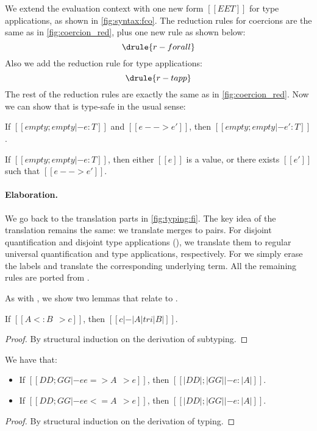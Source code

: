 We extend the evaluation context with one new form $[[EE T]]$ for type
applications, as shown in \cref{fig:syntax:fco}. The reduction rules for
coercions are the same as in \cref{fig:coercion_red}, plus one new rule
 as shown below:
\[
  \drule{r-forall}
\]
Also we add the reduction rule for type applications:
\[
  \drule{r-tapp}
\]
The rest of the reduction rules are exactly the same as in \cref{fig:coercion_red}. Now we can show
that \tnamee is type-safe in the usual sense:

\begin{theorem}
  If $[[empty; empty |- e : T]]$ and $[[e --> e']]$, then $[[empty; empty |- e' : T]]$.
\end{theorem}

\begin{theorem}
  If $[[empty; empty |- e : T]]$, then either $[[e]]$ is a value, or there exists $[[e']]$ such
  that $[[e --> e']]$.
\end{theorem}


\paragraph{Elaboration.}

We go back to the translation parts in \cref{fig:typing:fi}. The key idea of the
translation remains the same: we translate merges to pairs. For disjoint
quantification and disjoint type applications (), we
translate them to regular universal quantification and type applications,
respectively. For  we simply erase
the labels and translate the corresponding underlying term. All the remaining
rules are ported from \namee.


As with \namee, we show two lemmas that relate \fnamee to \tnamee.

\begin{lemma}
  If $[[A <: B ~~> c]]$, then $[[c |-  |A| tri |B|]]$.
  \label{lemma:sub-correct:fi}
\end{lemma}
\begin{proof}
  By structural induction on the derivation of subtyping.
\end{proof}


\begin{lemma} We have that:
  \begin{itemize}
  \item If $[[DD ; GG |- ee => A ~~> e]]$, then $[[ |DD| ; |GG| |- e : |A | ]]$.
  \item If $[[DD ; GG |- ee <= A ~~> e]]$, then $[[ |DD| ; |GG| |- e : |A | ]]$.
  \end{itemize}
\end{lemma}
\begin{proof}
  By structural induction on the derivation of typing.
\end{proof}



